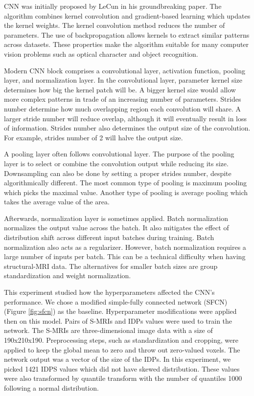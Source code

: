 \documentclass{article}
\begin{document}
    CNN was initially proposed by LeCun\cite{lecun} in his groundbreaking paper. 
    The algorithm combines kernel convolution and gradient-based learning which updates the kernel weights. 
    The kernel convolution method reduces the number of parameters. 
    The use of backpropagation allows kernels to extract similar patterns across datasets. 
    These properties make the algorithm suitable for many computer vision problems such as optical character and object recognition.

    Modern CNN block comprises a convolutional layer, activation function, pooling layer, and normalization layer. 
    In the convolutional layer, parameter kernel size determines how big the kernel patch will be. 
    A bigger kernel size would allow more complex patterns in trade of an increasing number of parameters. 
    Strides number determine how much overlapping region each convolution will share. 
    A larger stride number will reduce overlap, although it will eventually result in loss of information. 
    Strides number also determines the output size of the convolution. 
    For example, strides number of 2 will halve the output size.

    A pooling layer often follows convolutional layer. 
    The purpose of the pooling layer is to select or combine the convolution output while reducing its size. 
    Downsampling can also be done by setting a proper strides number, despite algorithmically different. 
    The most common type of pooling is maximum pooling which picks the maximal value. 
    Another type of pooling is average pooling which takes the average value of the area.

    Afterwards, normalization layer is sometimes applied. Batch normalization normalizes the output value across the batch. 
    It also mitigates the effect of distribution shift across different input batches during training. 
    Batch normalization also acts as a regularizer.   
    However, batch normalization requires a large number of inputs per batch. 
    This can be a technical difficulty when having structural-MRI data. 
    The alternatives for smaller batch sizes are group standardization and weight normalization.

    This experiment studied how the hyperparameters affected the CNN's performance. 
    We chose a modified simple-fully connected network (SFCN) (Figure \ref{fig:sfcn}) as the baseline. 
    Hyperparameter modifications were applied then on this model. 
    Pairs of S-MRIs and IDPs values were used to train the network. 
    The S-MRIs are three-dimensional image data with a size of 190x210x190. 
    Preprocessing steps, such as standardization and cropping, were applied to keep the global mean to zero and throw out zero-valued voxels. 
    The network output was a vector of the size of the IDPs. 
    In this experiment, we picked 1421 IDPS values which did not have skewed distribution. 
    These values were also transformed by quantile transform with the number of quantiles 1000 following a normal distribution.
\end{document}
